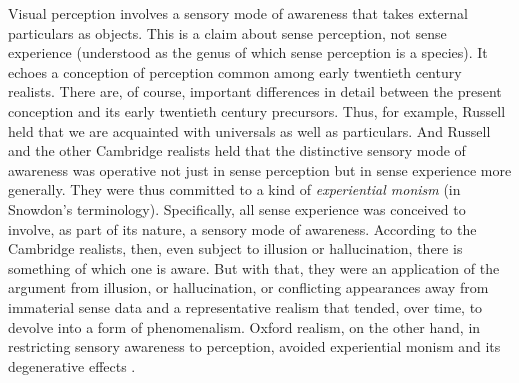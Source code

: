 \documentclass[12pt]{article}
\begin{document}
Visual perception involves a sensory mode of awareness that takes external particulars as objects. This is a claim about sense perception, not sense experience (understood as the genus of which sense perception is a species). It echoes a conception of perception common among early twentieth century realists. There are, of course, important differences in detail between the present conception and its early twentieth century precursors. Thus, for example, Russell held that we are acquainted with universals as well as particulars. And Russell and the other Cambridge realists held that the distinctive sensory mode of awareness was operative not just in sense perception but in sense experience more generally. They were thus committed to a kind of \emph{experiential monism} (in Snowdon's \citeyear{Snowdon:2008oz} terminology). Specifically, all sense experience was conceived to involve, as part of its nature, a sensory mode of awareness. According to the Cambridge realists, then, even subject to illusion or hallucination, there is something of which one is aware. But with that, they were an application of the argument from illusion, or hallucination, or conflicting appearances away from immaterial sense data and a representative realism that tended, over time, to devolve into a form of phenomenalism. Oxford realism, on the other hand, in restricting sensory awareness to perception, avoided experiential monism and its degenerative effects \citep[see][]{Marion:2000kl,Marion:2000ai,Kalderon:2010fk}.
\end{document}
